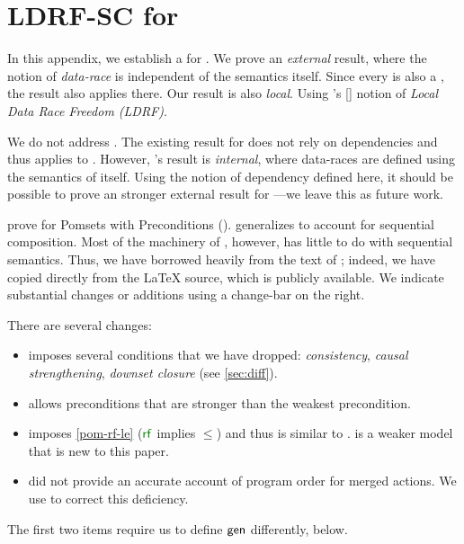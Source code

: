 \section{LDRF-SC for \PwTmcaTITLE{}}
\label{sec:sc}

\begin{changed}
  In this appendix, we establish a \drfsc{} for .  We prove an
  \emph{external} result, where the notion of \emph{data-race} is independent
  of the semantics itself.  Since every  is also a , the
  result also applies there.  Our result is also \emph{local}.  Using
  \citeauthor{Dolan:2018:BDR:3192366.3192421}'s
  [\citeyear{Dolan:2018:BDR:3192366.3192421}] notion of \emph{Local Data Race
    Freedom (LDRF)}.

  We do not address \PwTc{}.  The existing \drfsc{} result for \cXI{}
  \cite{DBLP:phd/ethos/Batty15} does not rely on dependencies and thus
  applies to \PwTc{}.  However, \citeauthor{DBLP:phd/ethos/Batty15}'s result
  is \emph{internal}, where data-races are defined using the semantics of
  \cXI{} itself.  Using the notion of dependency defined here, it should be
  possible to prove an stronger external result for \cXI{}---we leave this as
  future work.

  \citet{DBLP:journals/pacmpl/JagadeesanJR20} prove \ldrfsc{} for Pomsets
  with Preconditions (\PwP{}).  \PwTmca{} generalizes \PwP{} to account for
  sequential composition.  Most of the machinery of \ldrfsc{}, however, has
  little to do with sequential semantics.  Thus, we have borrowed heavily
  from the text of \cite{DBLP:journals/pacmpl/JagadeesanJR20}; indeed, we
  have copied directly from the \LaTeX{} source, which is publicly available.
  We indicate substantial changes or additions using a change-bar on the
  right.

  There are several changes:
  \begin{itemize}
  \item \PwP{} imposes several conditions that we have dropped:
    \emph{consistency}, \emph{causal strengthening}, \emph{downset closure}
    (see \textsection\ref{sec:diff}).
  \item \PwP{} allows preconditions that are stronger than the weakest precondition.
  \item \PwP{} imposes \ref{pom-rf-le} ($\rrfx$ implies $\le$) and thus is
    similar to .   is a weaker model that is new to this
    paper.  %
  \item \PwP{} did not provide an accurate account of program order for
    merged actions.  We use  to correct this deficiency.
  \end{itemize}
  The first two items require us to define $\semmin{}$ differently, below.
\end{changed}

